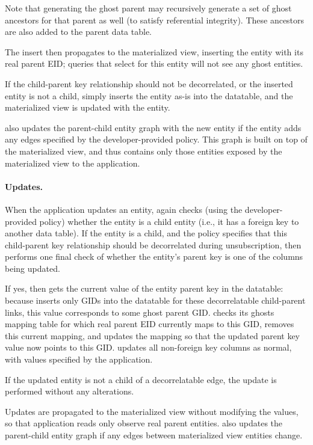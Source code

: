 Note that generating the ghost parent may recursively generate a set of ghost ancestors for that
parent as well (to satisfy referential integrity). These ancestors are also added to the parent data
table.

The insert then propagates to the materialized view, inserting the entity with its real parent EID; queries that
select for this entity will not see any ghost entities. 

If the child-parent key relationship should not be decorrelated, or the inserted entity is not a
child, \sys simply inserts the entity as-is into the datatable, and the materialized view is
updated with the entity.

\sys also updates the parent-child entity graph with the new entity if the entity adds any edges
specified by the developer-provided policy. This graph is built on top of the materialized view, and
thus contains only those entities exposed by the materialized view to the application.

\paragraph{Updates.}
When the application updates an entity, \sys again checks (using the developer-provided policy) whether
the entity is a child entity (i.e., it has a foreign key to another data table). 
If the entity is a child, and the policy specifies that this child-parent key
relationship should be decorrelated during unsubscription, then \sys performs one final check of
whether the entity's parent key is one of the columns being updated.

If yes, then \sys gets the current value of the entity parent key in the datatable: because \sys
inserts only GIDs into the datatable for these decorrelatable child-parent links, this value 
corresponds to some ghost parent GID.
\sys checks its ghosts mapping table for which real parent EID currently maps to this GID, removes
this current mapping, and updates the mapping so that the updated parent key value now points to
this GID.
\sys updates all non-foreign key columns as normal, with values specified by the application.

If the updated entity is not a child of a decorrelatable edge, the update is performed without any
alterations.

Updates are propagated to the materialized view without modifying the values, so that application
reads only observe real parent entities.
\sys also updates the parent-child entity graph if any edges between materialized view entities change.

